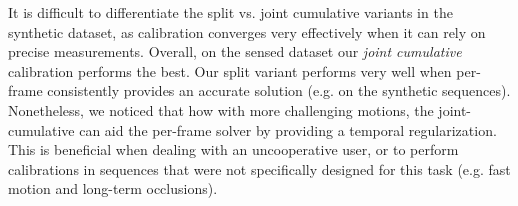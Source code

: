 
It is difficult to differentiate the split vs. joint  cumulative variants in the synthetic dataset, as calibration converges very effectively when it can rely on precise measurements. 
Overall, on the sensed dataset our \emph{joint cumulative} calibration performs the best. Our split variant performs very well when per-frame consistently provides an accurate solution (e.g. on the synthetic sequences). Nonetheless, we noticed that how with more challenging motions, the joint-cumulative can aid the per-frame solver by providing a temporal regularization. This is beneficial when dealing with an uncooperative user, or to perform calibrations in sequences that were not specifically designed for this task (e.g. fast motion and long-term occlusions).



